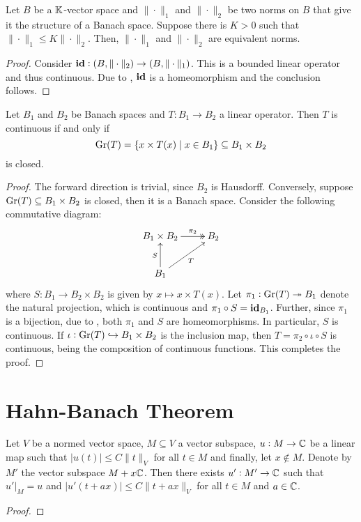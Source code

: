 \begin{example}
    Let $B$ be a $\mathbb K$-vector space and $\|\cdot\|_1$ and $\|\cdot\|_2$ be two norms on $B$ that give it the structure of a Banach space. Suppose there is $K > 0$ such that $\|\cdot\|_1\le K\|\cdot\|_2$. Then, $\|\cdot\|_1$ and $\|\cdot\|_2$ are equivalent norms.
\end{example}
\begin{proof}
    Consider $\mathbf{id}: (B,\|\cdot\|_2)\to(B,\|\cdot\|_1)$. This is a bounded linear operator and thus continuous. Due to , $\mathbf{id}$ is a homeomorphism and the conclusion follows.
\end{proof}

\begin{theorem}
    Let $B_1$ and $B_2$ be Banach spaces and $T: B_1\to B_2$ a linear operator. Then $T$ is continuous if and only if 
    \begin{equation*}
        \operatorname{Gr}(T) = \{x\times T(x)\mid x\in B_1\}\subseteq B_1\times B_2
    \end{equation*}
    is closed.
\end{theorem}
\begin{proof}
    The forward direction is trivial, since $B_2$ is Hausdorff. Conversely, suppose $\operatorname{Gr}(T)\subseteq B_1\times B_2$ is closed, then it is a Banach space. Consider the following commutative diagram: 
    \begin{equation*}
        \xymatrix {
            B_1\times B_2\ar@{->>}[r]^-{\pi_2} & B_2\\
            B_1\ar[u]^S\ar[ru]_T &
        }
    \end{equation*}
    where $S: B_1\to B_2\times B_2$ is given by $x\mapsto x\times T(x)$. Let $\pi_1:\operatorname{Gr}(T)\twoheadrightarrow B_1$ denote the natural projection, which is continuous and $\pi_1\circ S = \mathbf{id}_{B_1}$. Further, since $\pi_1$ is a bijection, due to , both $\pi_1$ and $S$ are homeomorphisms. In particular, $S$ is continuous. If $\iota: \operatorname{Gr}(T)\hookrightarrow B_1\times B_2$ is the inclusion map, then $T = \pi_2\circ\iota\circ S$ is continuous, being the composition of continuous functions. This completes the proof.
\end{proof}

\section{Hahn-Banach Theorem}

\begin{lemma}
    Let $V$ be a normed vector space, $M\subseteq V$ a vector subspace, $u: M\to\mathbb{C}$ be a linear map such that $|u(t)|\le C\|t\|_V$ for all $t\in M$ and finally, let $x\notin M$. Denote by $M'$ the vector subspace $M + x\mathbb{C}$. Then there exists $u': M'\to\mathbb{C}$ such that $u'|_M = u$ and $|u'(t + ax)|\le C\|t + ax\|_V$ for all $t\in M$ and $a\in\mathbb{C}$.
\end{lemma}
\begin{proof}
\end{proof}

